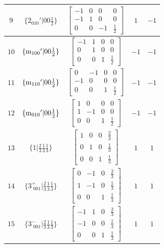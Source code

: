 \documentclass[fleqn,8pt]{jsarticle}
\begin{document}
\begin{longtable}{ccccc}
$ 9 $ & $ \{2{}_{010}{}'|0 0 \frac{1}{2}\} $ & $ \begin{bmatrix} -1 & 0 & 0 & 0 \\ -1 & 1 & 0 & 0 \\ 0 & 0 & -1 & \frac{1}{2} \end{bmatrix} $ & $ 1 $ & $ -1 $ \\ \hline
$ 10 $ & $ \{{\rm m}_{100}{}'|0 0 \frac{1}{2}\} $ & $ \begin{bmatrix} -1 & 1 & 0 & 0 \\ 0 & 1 & 0 & 0 \\ 0 & 0 & 1 & \frac{1}{2} \end{bmatrix} $ & $ -1 $ & $ -1 $ \\ \hline
$ 11 $ & $ \{{\rm m}_{110}{}'|0 0 \frac{1}{2}\} $ & $ \begin{bmatrix} 0 & -1 & 0 & 0 \\ -1 & 0 & 0 & 0 \\ 0 & 0 & 1 & \frac{1}{2} \end{bmatrix} $ & $ -1 $ & $ -1 $ \\ \hline
$ 12 $ & $ \{{\rm m}_{010}{}'|0 0 \frac{1}{2}\} $ & $ \begin{bmatrix} 1 & 0 & 0 & 0 \\ 1 & -1 & 0 & 0 \\ 0 & 0 & 1 & \frac{1}{2} \end{bmatrix} $ & $ -1 $ & $ -1 $ \\ \hline
$ 13 $ & $ \{1|\frac{2}{3} \frac{1}{3} \frac{1}{3}\} $ & $ \begin{bmatrix} 1 & 0 & 0 & \frac{2}{3} \\ 0 & 1 & 0 & \frac{1}{3} \\ 0 & 0 & 1 & \frac{1}{3} \end{bmatrix} $ & $ 1 $ & $ 1 $ \\ \hline
$ 14 $ & $ \{3^{+}_{\,\,001}|\frac{2}{3} \frac{1}{3} \frac{1}{3}\} $ & $ \begin{bmatrix} 0 & -1 & 0 & \frac{2}{3} \\ 1 & -1 & 0 & \frac{1}{3} \\ 0 & 0 & 1 & \frac{1}{3} \end{bmatrix} $ & $ 1 $ & $ 1 $ \\ \hline
$ 15 $ & $ \{3^{-}_{\,\,001}|\frac{2}{3} \frac{1}{3} \frac{1}{3}\} $ & $ \begin{bmatrix} -1 & 1 & 0 & \frac{2}{3} \\ -1 & 0 & 0 & \frac{1}{3} \\ 0 & 0 & 1 & \frac{1}{3} \end{bmatrix} $ & $ 1 $ & $ 1 $ \\ \hline

\end{longtable}
\end{document}
